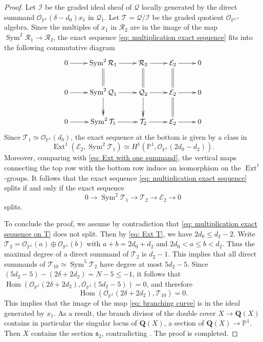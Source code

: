 \documentclass[a4paper,11pt]{amsart}
\newcommand{\PP}{\ensuremath{\mathbb{P}}}
\DeclareMathOperator{\Ext}{Ext}
\DeclareMathOperator{\Hom}{Hom}
\DeclareMathOperator{\Sym}{Sym}
\theoremstyle{definition}
\theoremstyle{remark}
\numberwithin{equation}{section}
\begin{document}
\begin{proof}
	Let $\mathcal{I}$ be the graded ideal sheaf of $\mathcal{Q}$ locally generated by the direct summand $\mathcal{O}_{\PP^1} (\delta - d_0) x_1$ in $\mathcal{Q}_1$. Let $\mathcal{T} = \mathcal{Q}/\mathcal{I}$ be the graded quotient $\mathcal{O}_{\PP^1}$-algebra.
	Since the multiples of $x_1$ in $\mathcal{R}_2$ are in the image of the map $\Sym^2 \mathcal{R}_1 \to \mathcal{R}_2$, the exact sequence \eqref{eq: multiplication exact sequence} fits into the following commutative diagram
	$$
	\xymatrix{
		0 \ar[r] & \Sym^2 \mathcal{R}_1 \ar[r] \ar@{=}[d] & \ar[r]\ar@{=}[d] \mathcal{R}_2 & \ar[r]\ar@{=}[d] \mathcal{E}_2 & 0
		\\
		0\ar[r] & \Sym^2 \mathcal{Q}_1 \ar[r]\ar@{->>}[d] & \ar[r]\ar@{->>}[d] \mathcal{Q}_2 & \ar[r]\ar@{=}[d] \mathcal{E}_2 & 0
		\\
		0\ar[r] & \Sym^2 \mathcal{T}_1\ar[r] & \ar[r] \mathcal{T}_2 & \ar[r] \mathcal{E}_2 & 0
	}
	$$
	Since $\mathcal{T}_1 \simeq \mathcal{O}_{\PP^1}(d_0)$, the exact sequence at the bottom is given by a class in 
	\begin{equation}\label{eq: Ext T}
	\Ext^1(\mathcal {E}_2, \Sym^2 \mathcal {T}_1) \simeq H^1 \left(\PP^1, \mathcal{O}_{\PP^1} (2d_0-d_2) \right).
	\end{equation}
	Moreover, comparing with \eqref{eq: Ext with one summand}, the vertical maps connecting the top row with the bottom row induce an isomorphism on the $\Ext^1$-groups. It follows that  the exact sequence \eqref{eq: multiplication exact sequence} splits if and only if the exact sequence 
	\begin{equation}\label{eq: multiplication exact sequence on T}
		0 \to \Sym^2 \mathcal{T}_1 \to \mathcal{T}_2 \to \mathcal{E}_2 \to 0
	\end{equation}
	splits.

	To conclude the proof, we assume by contradiction that \eqref{eq: multiplication exact sequence on T} does not split. Then by \eqref{eq: Ext T}, we have $2d_0\le d_2-2$. Write $\mathcal{T}_2=\mathcal{O}_{\PP^1}(a)\oplus\mathcal{O}_{\PP^1}(b)$ with $a+b=2d_0+d_2$ and $2d_0<a\le b<d_2$. Thus the maximal degree of a direct summand of ${\mathcal T}_2$ is $d_2-1$. This implies that all direct summands of $\mathcal{T}_{10} \simeq \Sym^5 {\mathcal T}_2$ have degree at most $5d_2 - 5$. Since $(5d_2 - 5) - (2\delta + 2d_2) = N - 5 \leq -1$, it follows that $\Hom \left(\mathcal{O}_{\PP^1}(2\delta + 2d_2), \mathcal{O}_{\PP^1}(5d_2 - 5) \right)=0$, and therefore
	$$
	\Hom(\mathcal{O}_{\PP^1}(2\delta + 2d_2), \mathcal{T}_{10}) = 0.
	$$
	This implies that the image of the map \eqref{eq: branching curve} is in the ideal generated by $x_1$. As a result, the branch divisor of the double cover $X \to \mathbf{Q}(X)$ contains in particular the singular locus of $\mathbf{Q}(X)$, a section of $\mathbf{Q}(X) \to \PP^1$. Then $X$ contains the section $\mathfrak{s}_2$, contradicting \cite[Proposition 4.9 (2)]{CP}. The proof is completed.
\end{proof}
\end{document}
